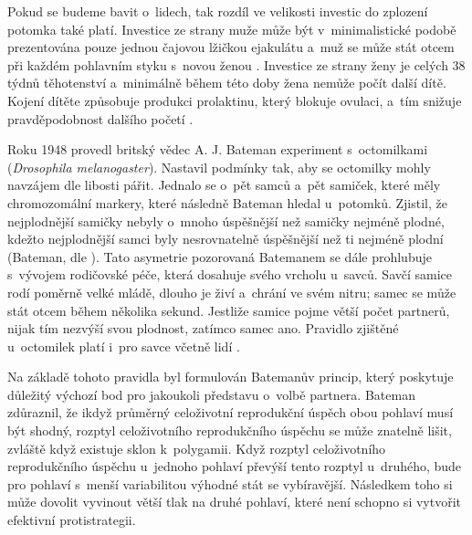 \documentclass[a4paper, 12pt, notitlepage, oneside, numbers=noenddot]{report}
\begin{document}
Pokud se budeme bavit o~lidech, tak rozdíl ve velikosti investic do
zplození potomka také platí.  Investice ze strany muže může být
v~minimalistické podobě prezentována pouze jednou čajovou lžičkou
ejakulátu a~muž se může stát otcem při každém pohlavním styku s~novou
ženou \citep{Buss2007}.  Investice ze strany ženy je celých 38 týdnů
těhotenství a~minimálně během této doby žena nemůže počít další dítě.
Kojení dítěte způsobuje produkci prolaktinu, který blokuje ovulaci,
a~tím snižuje pravděpodobnost dalšího početí \citep{Kovar2005}.

Roku 1948 provedl britský vědec A. J. Bateman experiment s~octomilkami
(\textit{Drosophila melanogaster}).  Nastavil podmínky tak, aby se
octomilky mohly navzájem dle libosti pářit.  Jednalo se o~pět samců
a~pět samiček, které měly chromozomální markery, které následně
Bateman hledal u~potomků.  Zjistil, že nejplodnější samičky nebyly
o~mnoho úspěšnější než samičky nejméně plodné, kdežto nejplodnější
samci byly nesrovnatelně úspěšnější než ti nejméně plodní (Bateman,
dle \citealp{Ridley2007,Trivers1972}).  Tato asymetrie pozorovaná
Batemanem se dále prohlubuje s~vývojem rodičovské péče, která dosahuje
svého vrcholu u~savců.  Savčí samice rodí poměrně velké mládě, dlouho
je živí a~chrání ve svém nitru; samec se může stát otcem během
několika sekund.  Jestliže samice pojme větší počet partnerů, nijak
tím nezvýší svou plodnost, zatímco samec ano.  Pravidlo zjištěné
u~octomilek platí i~pro savce včetně lidí \citet{Ridley2007,Buss2007}.

Na základě tohoto pravidla byl formulován Batemanův princip, který
poskytuje dů\-le\-ži\-tý výchozí bod pro jakoukoli představu o~volbě
partnera.  Bateman \citep{BarrettDunbarLycett2007} zdůraznil, že
ikdyž průměrný celoživotní reprodukční úspěch obou pohlaví musí být
shodný, rozptyl celoživotního reprodukčního úspěchu se může znatelně
lišit, zvláště když existuje sklon k~polygamii.  Když rozptyl
celoživotního reprodukčního úspěchu u~jednoho pohlaví převýší tento
rozptyl u~druhého, bude pro pohlaví s~menší variabilitou výhodné stát
se vybíravější.  Následkem toho si může dovolit vyvinout větší tlak na
druhé pohlaví, které není schopno si vytvořit efektivní
protistrategii.
\end{document}
